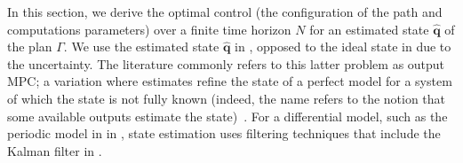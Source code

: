 In this section, we derive the optimal control (the configuration of the path and computations parameters) over a finite time horizon $N$ for an estimated state $\hat{\mathbf{q}}$ of the plan $\Gamma$. We use the estimated state $\hat{\mathbf{q}}$ in , opposed to the ideal state in  due to the uncertainty. The literature commonly refers to this latter problem as output MPC; a variation where estimates refine the state of a perfect model for a system of which the state is not fully known (indeed, the name refers to the notion that some available outputs estimate the state)~\citep{rawlings2017model}. For a differential model, such as the periodic model in  in , state estimation uses filtering techniques that include the Kalman filter in .

